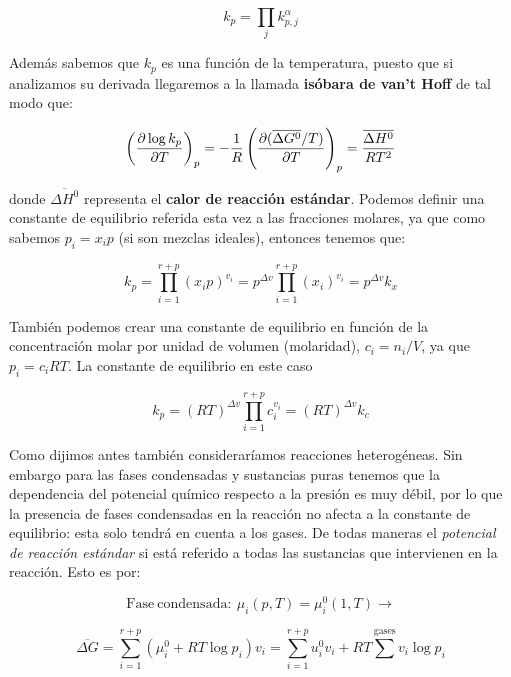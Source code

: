 \documentclass[12pt,a4paper,oneside]{book}
\begin{document}
\begin{equation}
k_{p} = \prod_j k_{p,j}^{\alpha}
\end{equation}

Además sabemos que $k_p$ es una función de la  temperatura, puesto que si analizamos su derivada llegaremos a la llamada \textbf{isóbara de van't Hoff} de tal modo que:

\begin{equation}
\left( \frac{\partial \log k_p}{\partial T} \right)_p = - \dfrac{1}{R} \left( \frac{\partial (\overline{\Delta G^0}/T)}{\partial T} \right)_p = \dfrac{\overline{\Delta H^0}}{RT^2}
\end{equation}

donde $\overline{\Delta H^0}$ representa el \textbf{calor de reacción estándar}. Podemos definir una constante de equilibrio referida esta vez a las fracciones molares, ya que como sabemos $p_i = x_i p$ (si son mezclas ideales), entonces tenemos que:

\begin{equation}
k_p = \prod_{i=1}^{r+p} (x_i p)^{v_i} = p^{\Delta v} \prod_{i=1}^{r+p} (x_i)^{v_i} = p^{\Delta v} k_x
\end{equation}

También podemos crear una constante de equilibrio en función de la concentración molar por unidad de volumen (molaridad), $c_i = n_i /V$, ya que $p_i = c_i RT$. La constante de equilibrio en este caso

\begin{equation}
k_p = (RT)^{\Delta v} \prod_{i=1}^{r+p} c_i^{v_i} = (RT)^{\Delta v} k_c
\end{equation}


Como dijimos antes también consideraríamos reacciones heterogéneas. Sin embargo para las fases condensadas y sustancias puras tenemos que la dependencia del potencial químico respecto a la presión es muy débil, por lo que la presencia de fases condensadas en la reacción no afecta a la constante de equilibrio: esta solo tendrá en cuenta a los gases. De todas maneras el \textit{potencial de reacción estándar} si está referido a todas las sustancias que intervienen en la reacción. Esto es por:

$$ \mathrm{Fase \ condensada:} \ \mu_i (p,T) = \mu_i^0 (1,T) \longrightarrow $$

\begin{equation}
 \overline{\Delta G} = \sum_{i=1}^{r+p} (\mu_i^0 + RT \log p_i ) v_i = \sum_{i=1}^{r+p} u_i^0 v_i + RT \sum^{\mathrm{gases}} v_i \log p_i
\end{equation}
\end{document}
